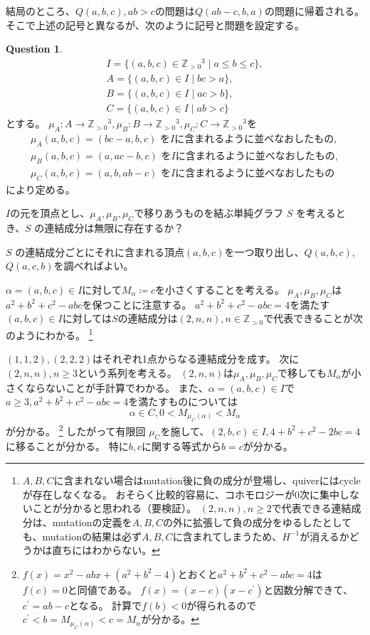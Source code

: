 \documentclass[uplatex,12pt,dvipdfmx]{jsarticle}
\theoremstyle{definition}
\newtheorem{question}[definition]{Question}
\numberwithin{equation}{section}
\newcommand{\Z}{\mathbb{Z}}
\begin{document}
結局のところ、$Q(a,b,c),ab>c$の問題は$Q(ab-c,b,a)$の問題に帰着される。
そこで上述の記号と異なるが、次のように記号と問題を設定する。

\begin{question}
	\begin{gather}
		I=\{(a,b,c)\in\Z_{>0}{}^3 \mid a\le b\le c\}, \\
		A=\{(a,b,c)\in I \mid bc>a\}, \\
		B=\{(a,b,c)\in I \mid ac>b\}, \\
		C=\{(a,b,c)\in I \mid ab>c\}
	\end{gather}
	とする。
	$\mu_A\colon A\to\Z_{>0}{}^3, \mu_B\colon B\to\Z_{>0}{}^3, \mu_C\colon C\to\Z_{>0}{}^3$を
	\begin{gather}
		\mu_A(a,b,c) = (bc-a,b,c)\text{ を$I$に含まれるように並べなおしたもの}, \\
		\mu_B(a,b,c) = (a,ac-b,c)\text{ を$I$に含まれるように並べなおしたもの}, \\
		\mu_C(a,b,c) = (a,b,ab-c)\text{ を$I$に含まれるように並べなおしたもの}
	\end{gather}
	により定める。

	$I$の元を頂点とし、$\mu_A, \mu_B, \mu_C$で移りあうものを結ぶ単純グラフ $S$ を考えるとき、$S$ の連結成分は無限に存在するか？
\end{question}
$S$ の連結成分ごとにそれに含まれる頂点$(a,b,c)$を一つ取り出し、$Q(a,b,c)$, $Q(a,c,b)$を調べればよい。

$\alpha = (a,b,c)\in I$に対して$M_\alpha\coloneq c$を小さくすることを考える。
$\mu_A, \mu_B, \mu_C$は$a^2+b^2+c^2-abc$を保つことに注意する。
$a^2+b^2+c^2-abc = 4$を満たす$(a,b,c)\in I$に対しては$S$の連結成分は$(2, n, n), n\in\Z_{>0}$で代表できることが次のようにわかる。
\footnote{
	$A,B,C$に含まれない場合はmutation後に負の成分が登場し、quiverにはcycleが存在しなくなる。
	おそらく比較的容易に、コホモロジーが0次に集中しないことが分かると思われる（要検証）。
	$(2, n, n), n\ge 2$で代表できる連結成分は、mutationの定義を$A,B,C$の外に拡張して負の成分をゆるしたとしても、mutationの結果は必ず$A,B,C$に含まれてしまうため、$H^{-1}$が消えるかどうかは直ちにはわからない。
}

$(1, 1, 2), (2, 2, 2)$はそれぞれ1点からなる連結成分を成す。
次に$(2, n, n),n\ge 3$という系列を考える。
$(2, n, n)$は$\mu_A, \mu_B, \mu_C$で移しても$M_\alpha$が小さくならないことが手計算でわかる。
また、$\alpha=(a,b,c)\in I$で$a\ge 3, a^2+b^2+c^2-abc=4$を満たすものについては
\begin{equation}
	\alpha\in C, 0 < M_{\mu_C(\alpha)} < M_\alpha
\end{equation}
が分かる。
\footnote{
	$f(x)=x^2-abx+(a^2+b^2-4)$とおくと$a^2+b^2+c^2-abc = 4$は$f(c)=0$と同値である。
	$f(x)=(x-c)(x-c^\prime)$と因数分解できて、$c^\prime = ab-c$となる。
	計算で$f(b)<0$が得られるので$c^\prime<b=M_{\mu_C(\alpha)}<c=M_\alpha$が分かる。
}
したがって有限回 $\mu_C$を施して、$(2,b,c)\in I, 4+b^2+c^2-2bc=4$に移ることが分かる。
特に$b,c$に関する等式から$b=c$が分かる。
\end{document}
